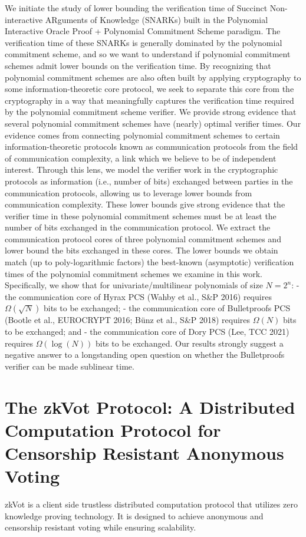 \documentclass[11pt,oneside]{book}
\theoremstyle{definition}
\theoremstyle{remark}
\theoremstyle{plain}
\begin{document}
We initiate the study of lower bounding the verification time of Succinct Non-interactive ARguments of Knowledge (SNARKs) built in the Polynomial Interactive Oracle Proof + Polynomial Commitment Scheme paradigm. The verification time of these SNARKs is generally dominated by the polynomial commitment scheme, and so we want to understand if polynomial commitment schemes admit lower bounds on the verification time. By recognizing that polynomial commitment schemes are also often built by applying cryptography to some information-theoretic core protocol, we seek to separate this core from the cryptography in a way that meaningfully captures the verification time required by the polynomial commitment scheme verifier. We provide strong evidence that several polynomial commitment schemes have (nearly) optimal verifier times. Our evidence comes from connecting polynomial commitment schemes to certain information-theoretic protocols known as communication protocols from the field of communication complexity, a link which we believe to be of independent interest. Through this lens, we model the verifier work in the cryptographic protocols as information (i.e., number of bits) exchanged between parties in the communication protocols, allowing us to leverage lower bounds from communication complexity. These lower bounds give strong evidence that the verifier time in these polynomial commitment schemes must be at least the number of bits exchanged in the communication protocol. We extract the communication protocol cores of three polynomial commitment schemes and lower bound the bits exchanged in these cores. The lower bounds we obtain match (up to poly-logarithmic factors) the best-known (asymptotic) verification times of the polynomial commitment schemes we examine in this work. Specifically, we show that for univariate/multilinear polynomials of size $N=2^n$: - the communication core of Hyrax PCS (Wahby et al., S\&P 2016) requires $\Omega(\sqrt{N})$ bits to be exchanged; - the communication core of Bulletproofs PCS (Bootle et al., EUROCRYPT 2016; Bünz et al., S\&P 2018) requires $\Omega(N)$ bits to be exchanged; and - the communication core of Dory PCS (Lee, TCC 2021) requires $\Omega(\log(N))$ bits to be exchanged. Our results strongly suggest a negative answer to a longstanding open question on whether the Bulletproofs verifier can be made sublinear time.

\section{\cite{cryptoeprint:2025/1709} The zkVot Protocol: A Distributed Computation Protocol for Censorship Resistant Anonymous Voting}
zkVot is a client side trustless distributed computation protocol that utilizes zero knowledge proving technology. It is designed to achieve anonymous and censorship resistant voting while ensuring scalability.
\end{document}
